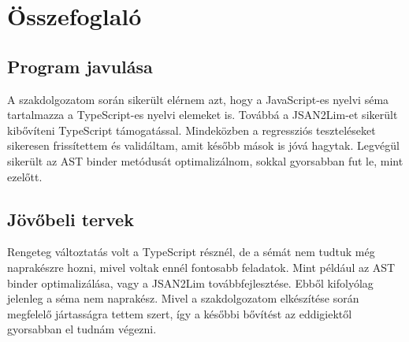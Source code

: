 \chapter{Összefoglaló}\label{chap:Összefoglaló}

\section{Program javulása}
A szakdolgozatom során sikerült elérnem azt, hogy a JavaScript-es nyelvi séma tartalmazza a TypeScript-es nyelvi elemeket is.
Továbbá a JSAN2Lim-et sikerült kibővíteni TypeScript támogatással.
Mindeközben a regressziós teszteléseket sikeresen frissítettem és validáltam, amit később mások is jóvá hagytak.
Legvégül sikerült az AST binder metódusát optimalizálnom, sokkal gyorsabban fut le, mint ezelőtt.

\section{Jövőbeli tervek}
Rengeteg változtatás volt a TypeScript résznél, de a sémát nem tudtuk még naprakészre hozni, mivel voltak ennél fontosabb feladatok.
Mint például az AST binder optimalizálása, vagy a JSAN2Lim továbbfejlesztése.
Ebből kifolyólag jelenleg a séma nem naprakész.
Mivel a szakdolgozatom elkészítése során megfelelő jártasságra tettem szert, így a későbbi bővítést az eddigiektől gyorsabban el tudnám végezni.

